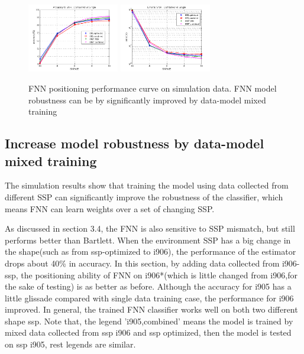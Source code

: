 \begin{figure}
\includegraphics[width=4cm,height=3cm]{figure/Accuracy_to_SNR_Combined_vs_Single}
\includegraphics[width=4cm,height=3cm]{figure/Error_to_SNR_Combined_vs_Single}
\caption{FNN positioning performance curve on simulation data. FNN model robustness can be by significantly improved by data-model mixed training}
\end{figure}

\subsection{%
Increase model robustness by data-model mixed training}
The simulation results show that training the model using data collected from different SSP can significantly improve the robustness of the classifier, which means FNN can learn weights over a set of changing SSP.


As discussed in section 3.4, the FNN is also sensitive to SSP mismatch, but still performs better than Bartlett. When the environment SSP has a big change in the shape(such as from ssp-optimized to i906), the performance of the estimator drops about 40\% in accuracy. In this section, by adding data collected from i906-ssp, the positioning ability of FNN on i906{*}(which is little changed from i906,for the sake of testing) is as better as before. Although the accuracy for i905 has a little glissade compared with single data training case, the performance for i906 improved. In general, the trained FNN classifier works well on both two different shape ssp. Note that, the legend 'i905,combined' means the model is trained by mixed data collected from ssp i906 and ssp optimized, then the model is tested on ssp i905, rest legends are similar.

